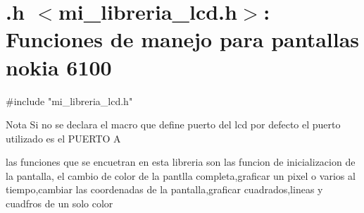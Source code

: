 \hypertarget{group__mi__libreria__lcd}{
\section{.h $<$mi\_\-libreria\_\-lcd.h$>$: Funciones de manejo para pantallas nokia 6100}
\label{group__mi__libreria__lcd}
}

\begin{DoxyCode}
    #include "mi_libreria_lcd.h"
\end{DoxyCode}


\begin{DoxyNote}{Nota}
Si no se declara el macro que define puerto del lcd por defecto el puerto utilizado es el PUERTO A
\end{DoxyNote}
las funciones que se encuetran en esta libreria son las funcion de inicializacion de la pantalla, el cambio de color de la pantlla completa,graficar un pixel o varios al tiempo,cambiar las coordenadas de la pantalla,graficar cuadrados,lineas y cuadfros de un solo color 